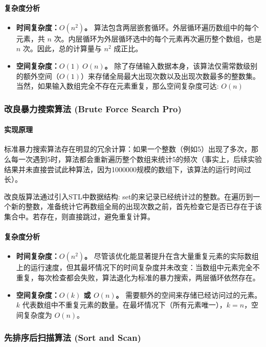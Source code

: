 \documentclass[UTF8,12pt,a4paper]{ctexart}
\begin{document}
\paragraph{复杂度分析}
\begin{itemize}
    \item \textbf{时间复杂度：$O(n^2)$。} 算法包含两层嵌套循环。外层循环遍历数组中的每个元素，共 $n$ 次。内层循环为外层循环选中的每个元素再次遍历整个数组，也是 $n$ 次。因此，总的计算量与 $n^2$ 成正比。
    \item \textbf{空间复杂度：$O(1)~O(n)$。} 除了存储输入数据本身，该算法仅需常数级别的额外空间（$O(1)$）来存储全局最大出现次数以及出现次数最多的整数集。当然，如果输入数组完全不存在元素重复，那么空间复杂度可达: $O(n)$
\end{itemize}

\subsubsection{改良暴力搜索算法 (Brute Force Search Pro)}
\paragraph{实现原理}
标准暴力搜索算法存在明显的冗余计算：如果一个整数（例如5）出现了多次，那么每一次遇到5时，算法都会重新遍历整个数组来统计5的频次（事实上，后续实验结果并未直接尝试此种算法，因为1000000规模的数组下，该算法的运行时间过长）。

改良版算法通过引入STL中数据结构: set的来记录已经统计过的整数。在遍历到一个新的整数，准备统计它再数组全局的出现次数之前，首先检查它是否已存在于该集合中。若存在，则直接跳过，避免重复计算。

\paragraph{复杂度分析}
\begin{itemize}
    \item \textbf{时间复杂度：$O(n^2)$。} 尽管该优化能显著提升在含大量重复元素的实际数组上的运行速度，但其最坏情况下的时间复杂度并未改变：当数组中元素完全不重复，每次检查都会失败，算法退化为标准的暴力搜索，两层循环依然存在。
    \item \textbf{空间复杂度：$O(k)$ 或 $O(n)$。} 需要额外的空间来存储已经访问过的元素。$k$ 代表数组中不重复元素的数量。在最坏情况下（所有元素唯一），$k=n$，空间复杂度为 $O(n)$。
\end{itemize}

\subsubsection{先排序后扫描算法 (Sort and Scan)}
\end{document}

